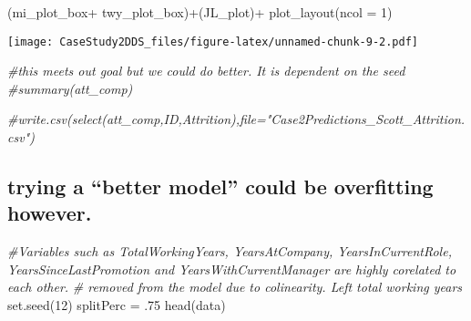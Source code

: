 \documentclass[
]{article}
\newenvironment{Shaded}{\begin{snugshade}}{\end{snugshade}}
\newcommand{\AttributeTok}[1]{\textcolor[rgb]{0.77,0.63,0.00}{#1}}
\newcommand{\CommentTok}[1]{\textcolor[rgb]{0.56,0.35,0.01}{\textit{#1}}}
\newcommand{\DecValTok}[1]{\textcolor[rgb]{0.00,0.00,0.81}{#1}}
\newcommand{\FunctionTok}[1]{\textcolor[rgb]{0.00,0.00,0.00}{#1}}
\newcommand{\NormalTok}[1]{#1}
\newcommand{\OtherTok}[1]{\textcolor[rgb]{0.56,0.35,0.01}{#1}}
\newcommand{\SpecialCharTok}[1]{\textcolor[rgb]{0.00,0.00,0.00}{#1}}
\begin{document}
\begin{Shaded}
\begin{Highlighting}[]
\NormalTok{(mi\_plot\_box}\SpecialCharTok{+}\NormalTok{ twy\_plot\_box)}\SpecialCharTok{+}\NormalTok{(JL\_plot)}\SpecialCharTok{+} \FunctionTok{plot\_layout}\NormalTok{(}\AttributeTok{ncol =} \DecValTok{1}\NormalTok{)}
\end{Highlighting}
\end{Shaded}

\texttt{[image: CaseStudy2DDS\_files/figure-latex/unnamed-chunk-9-2.pdf]}

\begin{Shaded}
\begin{Highlighting}[]
\CommentTok{\#this meets out goal but we could do better. It is dependent on the seed}
\CommentTok{\#summary(att\_comp)}


\CommentTok{\#write.csv(select(att\_comp,ID,Attrition),file="Case2Predictions\_Scott\_Attrition.csv")}
\end{Highlighting}
\end{Shaded}

\hypertarget{trying-a-better-model-could-be-overfitting-however.}{%
\subsection{trying a ``better model'' could be overfitting
however.}\label{trying-a-better-model-could-be-overfitting-however.}}

\begin{Shaded}
\begin{Highlighting}[]
\CommentTok{\#Variables such as TotalWorkingYears, YearsAtCompany, YearsInCurrentRole, YearsSinceLastPromotion and YearsWithCurrentManager are highly corelated to each other.}
\CommentTok{\# removed from the model due to colinearity. Left total working years}
\FunctionTok{set.seed}\NormalTok{(}\DecValTok{12}\NormalTok{)}
\NormalTok{splitPerc }\OtherTok{=}\NormalTok{ .}\DecValTok{75}
\FunctionTok{head}\NormalTok{(data)}
\end{Highlighting}
\end{Shaded}
\end{document}
